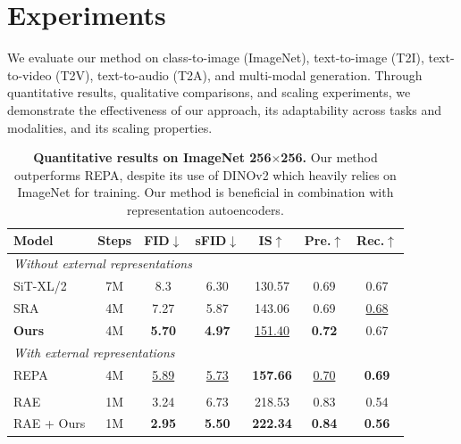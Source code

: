 \section{Experiments}

\label{sec:experiments}

We evaluate our method on class-to-image (ImageNet), text-to-image (T2I), text-to-video (T2V), text-to-audio (T2A), and multi-modal generation. 
Through quantitative results, qualitative comparisons, and scaling experiments, we demonstrate the effectiveness of our approach, its adaptability across tasks and modalities, and its scaling properties.


\begin{table}[t]
  \centering
  \caption{\textbf{Quantitative results on ImageNet 256$\times$256.} Our method outperforms REPA, despite its use of DINOv2 which heavily relies on ImageNet for training. Our method is beneficial in combination with representation autoencoders.}
  \label{tab:imagenet}
  \small
  \setlength{\tabcolsep}{3pt}
  \begin{tabular}{@{}lcccccc@{}}
    \toprule
    Model & Steps & FID$\downarrow$ & sFID$\downarrow$ & IS$\uparrow$ & Pre.$\uparrow$ & Rec.$\uparrow$ \\
    \midrule
    \multicolumn{7}{l}{\textit{Without external representations}} \\
    SiT-XL/2 & 7M & 8.3 & 6.30 & 130.57 & 0.69 & 0.67 \\
    SRA & 4M & 7.27 & 5.87 & 143.06 & 0.69 & \underline{0.68} \\
    \textbf{Ours} & {4M} & \textbf{5.70} & \textbf{4.97} & \underline{151.40} & \textbf{0.72} & {0.67} \\
    \midrule
    \multicolumn{7}{l}{\textit{With external representations}} \\
    REPA & 4M & \underline{5.89} & \underline{5.73} & \textbf{157.66} & \underline{0.70} & \textbf{0.69} \\
    \addlinespace[0.3em]
    \hdashline
    \addlinespace[0.3em]
    \multicolumn{6}{l}{\textit{With representation autoencoders}} \\
    RAE & 1M & 3.24 & 6.73 & 218.53 & 0.83 & 0.54 \\
    RAE + Ours & 1M & \textbf{2.95} & \textbf{5.50} & \textbf{222.34} & \textbf{0.84} & \textbf{0.56} \\
    \bottomrule
  \end{tabular}
\end{table}

